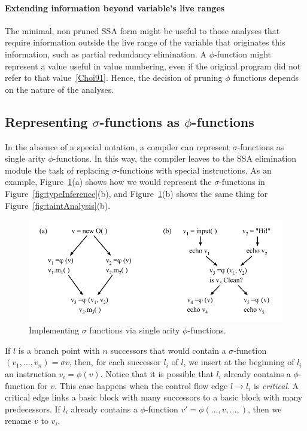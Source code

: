 \paragraph{Extending information beyond variable's live ranges}

The minimal, non pruned SSA form might be useful to those analyses that require
information outside the live range of the variable that originates this
information, such as partial redundancy elimination. 
A $\phi$-function might represent a value useful in value numbering, even if the
original program did not refer to that value~\ref{Choi91}.
Hence, the decision of pruning $\phi$ functions depends on the nature of the
analyses.

\subsection{Representing $\sigma$-functions as $\phi$-functions}
\label{sub:ssi:special}

In the absence of a special notation, a compiler can represent $\sigma$-functions
as single arity $\phi$-functions.
In this way, the compiler leaves to the SSA elimination module the task of
replacing $\sigma$-functions with special instructions.
As an example, Figure~\ref{fig:sigImpl}(a) shows how we would represent the
$\sigma$-functions in Figure~\ref{fig:typeInference}(b), and
Figure~\ref{fig:sigImpl}(b) shows the same thing for
Figure~\ref{fig:taintAnalysis}(b).

\begin{figure}[t!]
\centering
\includegraphics[scale=0.9]{sigImpl}
\caption{Implementing $\sigma$ functions via single arity $\phi$-functions.}
\label{fig:sigImpl}
\end{figure}

If $l$ is a branch point with $n$ successors that would contain a
$\sigma$-function $(v_1, \ldots, v_n) =\sigma v$, then, for each successor
$l_i$ of $l$, we insert at the beginning of $l_i$ an instruction
$v_i = \phi(v)$.
Notice that it is possible that $l_i$ already contains a $\phi$-function for
$v$.
This case happens when the control flow edge $l \rightarrow l_i$ is
{\em critical}.
A critical edge links a basic block with many successors to a basic block with
many predecessors.
If $l_i$ already contains a $\phi$-function $v' = \phi(\ldots, v, \ldots,)$,
then we rename $v$ to $v_i$.

